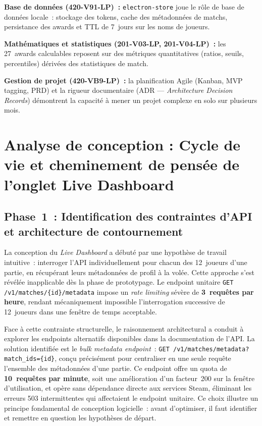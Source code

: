 \documentclass[12pt,a4paper]{article}
\begin{document}
\textbf{Base de données (420-V91-LP)~:} \texttt{electron-store} joue le
rôle de base de données locale~: stockage des tokens, cache des
métadonnées de matchs, persistance des awards et TTL de 7~jours sur les
noms de joueurs.

\textbf{Mathématiques et statistiques (201-V03-LP, 201-V04-LP)~:} les
27~awards calculables reposent sur des métriques quantitatives (ratios,
seuils, percentiles) dérivées des statistiques de match.

\textbf{Gestion de projet (420-VB9-LP)~:} la planification Agile
(Kanban, MVP tagging, PRD) et la rigueur documentaire (ADR ---
\textit{Architecture Decision Records}) démontrent la capacité à mener
un projet complexe en solo sur plusieurs mois.

\section{Analyse de conception : Cycle de vie et cheminement de pensée de l'onglet Live Dashboard}

\subsection{Phase~1~: Identification des contraintes d'API et architecture de contournement}

La conception du \textit{Live Dashboard} a débuté par une hypothèse de travail intuitive~: interroger l'API individuellement pour chacun des 12~joueurs d'une partie, en récupérant leurs métadonnées de profil à la volée. Cette approche s'est révélée inapplicable dès la phase de prototypage. Le endpoint unitaire \texttt{GET /v1/matches/\{id\}/metadata} impose un \textit{rate limiting} sévère de \textbf{3~requêtes par heure}, rendant mécaniquement impossible l'interrogation successive de 12~joueurs dans une fenêtre de temps acceptable.

Face à cette contrainte structurelle, le raisonnement architectural a conduit à explorer les endpoints alternatifs disponibles dans la documentation de l'API. La solution identifiée est le \textit{bulk metadata endpoint}~: \texttt{GET /v1/matches/metadata?match\_ids=\{id\}}, conçu précisément pour centraliser en une seule requête l'ensemble des métadonnées d'une partie. Ce endpoint offre un quota de \textbf{10~requêtes par minute}, soit une amélioration d'un facteur~200 sur la fenêtre d'utilisation, et opère sans dépendance directe aux services Steam, éliminant les erreurs 503 intermittentes qui affectaient le endpoint unitaire. Ce choix illustre un principe fondamental de conception logicielle~: avant d'optimiser, il faut identifier et remettre en question les hypothèses de départ.
\end{document}
